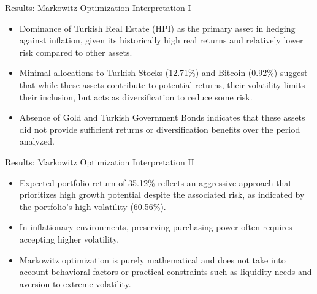 \documentclass{beamer}
\begin{document}
\begin{frame}{Results: Markowitz Optimization Interpretation I}
\begin{itemize}
\item Dominance of Turkish Real Estate (HPI) as the primary asset in hedging against inflation, given its historically high real returns and relatively lower risk compared to other assets.
\item Minimal allocations to Turkish Stocks (12.71\%) and Bitcoin (0.92\%) suggest that while these assets contribute to potential returns, their volatility limits their inclusion, but acts as diversification to reduce some risk.
\item Absence of Gold and Turkish Government Bonds indicates that these assets did not provide sufficient returns or diversification benefits over the period analyzed.
\end{itemize}
\end{frame}

\begin{frame}{Results: Markowitz Optimization Interpretation II}
\begin{itemize}
\item Expected portfolio return of 35.12\% reflects an aggressive approach that prioritizes high growth potential despite the associated risk, as indicated by the portfolio’s high volatility (60.56\%).
\item In inflationary environments, preserving purchasing power often requires accepting higher volatility.
\item Markowitz optimization is purely mathematical and does not take into account behavioral factors or practical constraints such as liquidity needs and aversion to extreme volatility. 
\end{itemize}
\end{frame}

\end{document}
